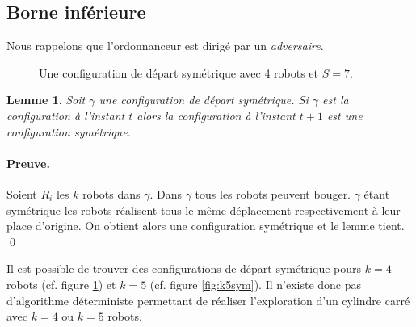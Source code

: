 \documentclass{article}
\newtheorem{lemme}{Lemme}
\begin{document}
    \subsection{Borne inférieure}

      Nous rappelons que l'ordonnanceur est dirigé par un {\it adversaire}.

      \begin{figure}[h]
        \centering
        \caption{Une configuration de départ symétrique avec 4 robots et $S = 7$.}
        \label{fig:k4sym}
      \end{figure}

      \begin{lemme}
        Soit $\gamma$ une configuration de départ symétrique. Si $\gamma$ est la
        configuration à l'instant $t$ alors la configuration à l'instant $t + 1$
        est une configuration symétrique.
      \end{lemme}
      
      \paragraph{Preuve.} Soient $R_i$ les $k$ robots dans $\gamma$. Dans
        $\gamma$ tous les robots peuvent bouger. $\gamma$ étant symétrique les
        robots réalisent tous le même déplacement respectivement à leur place
        d'origine. On obtient alors une configuration symétrique et le lemme
        tient. \qed \medskip

      Il est possible de trouver des configurations de départ symétrique pours
      $k = 4$ robots (cf. figure \ref{fig:k4sym}) et $k = 5$ (cf. figure
      \ref{fig:k5sym}). Il n'existe donc pas d'algorithme déterministe
      permettant de réaliser l'exploration d'un cylindre carré avec $k = 4$ ou
      $k = 5$ robots.
\end{document}
